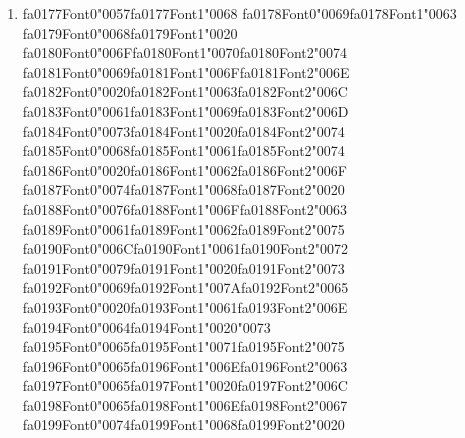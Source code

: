 \documentclass[12pt]{article}
\begin{document}
\begin{enumerate}[label=Q\arabic*.]
 \begin{enumerate}[label=(\Alph*)]
     \item Cross-entropy over the vocabulary
     \item Smooth L1 over embeddings
     \item Hinge loss over tags
     \item Binary cross-entropy per position
 \end{enumerate}
 
 \item {\csname fa0177Font0\endcsname\char"0057}{\csname fa0177Font1\endcsname\char"0068} {\csname fa0178Font0\endcsname\char"0069}{\csname fa0178Font1\endcsname\char"0063} {\csname fa0179Font0\endcsname\char"0068}{\csname fa0179Font1\endcsname\char"0020} {\csname fa0180Font0\endcsname\char"006F}{\csname fa0180Font1\endcsname\char"0070}{\csname fa0180Font2\endcsname\char"0074} {\csname fa0181Font0\endcsname\char"0069}{\csname fa0181Font1\endcsname\char"006F}{\csname fa0181Font2\endcsname\char"006E} {\csname fa0182Font0\endcsname\char"0020}{\csname fa0182Font1\endcsname\char"0063}{\csname fa0182Font2\endcsname\char"006C} {\csname fa0183Font0\endcsname\char"0061}{\csname fa0183Font1\endcsname\char"0069}{\csname fa0183Font2\endcsname\char"006D} {\csname fa0184Font0\endcsname\char"0073}{\csname fa0184Font1\endcsname\char"0020}{\csname fa0184Font2\endcsname\char"0074} {\csname fa0185Font0\endcsname\char"0068}{\csname fa0185Font1\endcsname\char"0061}{\csname fa0185Font2\endcsname\char"0074} {\csname fa0186Font0\endcsname\char"0020}{\csname fa0186Font1\endcsname\char"0062}{\csname fa0186Font2\endcsname\char"006F} {\csname fa0187Font0\endcsname\char"0074}{\csname fa0187Font1\endcsname\char"0068}{\csname fa0187Font2\endcsname\char"0020} {\csname fa0188Font0\endcsname\char"0076}{\csname fa0188Font1\endcsname\char"006F}{\csname fa0188Font2\endcsname\char"0063} {\csname fa0189Font0\endcsname\char"0061}{\csname fa0189Font1\endcsname\char"0062}{\csname fa0189Font2\endcsname\char"0075} {\csname fa0190Font0\endcsname\char"006C}{\csname fa0190Font1\endcsname\char"0061}{\csname fa0190Font2\endcsname\char"0072} {\csname fa0191Font0\endcsname\char"0079}{\csname fa0191Font1\endcsname\char"0020}{\csname fa0191Font2\endcsname\char"0073} {\csname fa0192Font0\endcsname\char"0069}{\csname fa0192Font1\endcsname\char"007A}{\csname fa0192Font2\endcsname\char"0065} {\csname fa0193Font0\endcsname\char"0020}{\csname fa0193Font1\endcsname\char"0061}{\csname fa0193Font2\endcsname\char"006E} {\csname fa0194Font0\endcsname\char"0064}{\csname fa0194Font1\endcsname\char"0020}{\char"0073} {\csname fa0195Font0\endcsname\char"0065}{\csname fa0195Font1\endcsname\char"0071}{\csname fa0195Font2\endcsname\char"0075} {\csname fa0196Font0\endcsname\char"0065}{\csname fa0196Font1\endcsname\char"006E}{\csname fa0196Font2\endcsname\char"0063} {\csname fa0197Font0\endcsname\char"0065}{\csname fa0197Font1\endcsname\char"0020}{\csname fa0197Font2\endcsname\char"006C} {\csname fa0198Font0\endcsname\char"0065}{\csname fa0198Font1\endcsname\char"006E}{\csname fa0198Font2\endcsname\char"0067} {\csname fa0199Font0\endcsname\char"0074}{\csname fa0199Font1\endcsname\char"0068}{\csname fa0199Font2\endcsname\char"0020} 
\end{enumerate}
\end{document}
